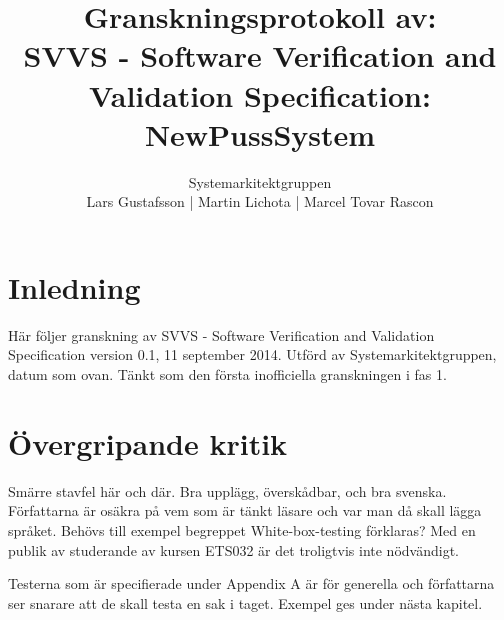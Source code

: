 \documentclass[a4paper]{article}
\title{Granskningsprotokoll av:\\ SVVS - Software Verification and Validation Specification: NewPussSystem}
\author{Systemarkitektgruppen \\ Lars Gustafsson | Martin Lichota | Marcel Tovar Rascon}
\date{}
\begin{document}
\maketitle
\thispagestyle{fancy}

\section{Inledning}       
Här följer granskning av SVVS - Software Verification and Validation Specification version 0.1, 11 september 2014. Utförd av Systemarkitektgruppen, datum som ovan. Tänkt som den första inofficiella granskningen i fas 1.

\section{Övergripande kritik}
Smärre stavfel här och där. Bra upplägg, överskådbar, och bra svenska.
Författarna är osäkra på vem som är tänkt läsare och var man då skall lägga språket. Behövs till exempel begreppet White-box-testing förklaras? Med en publik av studerande av kursen ETS032 är det troligtvis inte nödvändigt.

Testerna som är specifierade under Appendix A är för generella och författarna ser snarare att de skall testa en sak i taget. Exempel ges under nästa kapitel.
\end{document}
